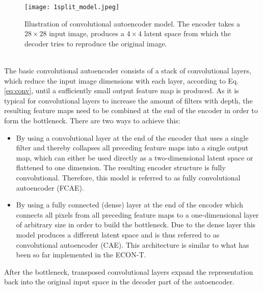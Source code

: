 \documentclass[../../main.tex]{subfiles}
\begin{document}
\begin{figure}[htp]
			\begin{center}
				\texttt{[image: 1split\_model.jpeg]}
				\caption{Illustration of convolutional autoencoder model. The encoder takes a $28\times28$ input image, produces a $4\times4$ latent space from which the decoder tries to reproduce the original image.}
				\label{fig:cae1}
			\end{center}
\end{figure}
\\
The basic convolutional autoencoder consists of a stack of convolutional layers, which reduce the input image dimensions with each layer, according to Eq. \ref{eq:conv}, until a sufficiently small output feature map is produced. As it is typical for convolutional layers to increase the amount of filters with depth, the resulting feature maps need to be combined at the end of the encoder in order to form the bottleneck. There are two ways to achieve this:
\begin{itemize}
	\item By using a convolutional layer at the end of the encoder that uses a single filter and thereby collapses all preceding feature maps into a single output map, which can either be used directly as a two-dimensional latent space or flattened to one dimension. The resulting encoder structure is fully convolutional. Therefore, this model is referred to as fully convolutional autoencoder (FCAE).
	\item By using a fully connected (dense) layer at the end of the encoder which connects all pixels from all preceding feature maps to a one-dimensional layer of arbitrary size in order to build the bottleneck. Due to the dense layer this model produces a different latent space and is thus referred to as convolutional autoencoder (CAE). This architecture is similar to what has been so far implemented in the ECON-T.
\end{itemize}
After the bottleneck, transposed convolutional layers expand the representation back into the original input space in the decoder part of the autoencoder.\\
\\
\end{document}
